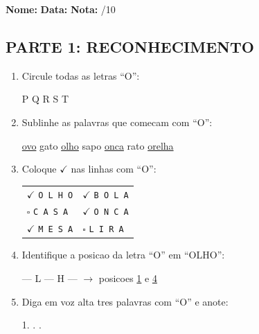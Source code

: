 \begin{exercicio}
\noindent\textbf{Nome:} \underline{\hspace{3.2cm}} \quad \textbf{Data:} \underline{\hspace{1.6cm}} \quad \textbf{Nota:} \underline{\hspace{0.9cm}}/10

\subsection*{PARTE 1: RECONHECIMENTO}

\begin{enumerate}
  \item Circule todas as letras ``O'':
  \begin{center}
   \quad P \quad {} \quad Q \quad {} \quad R \quad {} \quad S \quad {} \quad T
  \end{center}

  \item Sublinhe as palavras que comecam com ``O'':
  \begin{center}
  \uline{ovo} \quad gato \quad \uline{olho} \quad sapo \quad \uline{onca} \quad rato \quad \uline{orelha}
  \end{center}

  \item Coloque $\checkmark$ nas linhas com ``O'':
  \begin{center}
  \begin{tabular}{ll}
  $\checkmark$ \texttt{O L H O} & $\checkmark$ \texttt{B O L A} \\
  $\square$ \texttt{C A S A} & $\checkmark$ \texttt{O N C A} \\
  $\checkmark$ \texttt{M E S A} & $\square$ \texttt{L I R A}
  \end{tabular}
  \end{center}

  \item Identifique a posicao da letra ``O'' em ``OLHO'':
  \begin{center}
   --- L --- H ---  $\rightarrow$ posicoes \underline{1} e \underline{4}
  \end{center}

  \item Diga em voz alta tres palavras com ``O'' e anote:
  \begin{center}
  1. \underline{\hspace{4cm}} . \underline{\hspace{4cm}} . \underline{\hspace{4cm}}
  \end{center}
\end{enumerate}


\end{exercicio}
